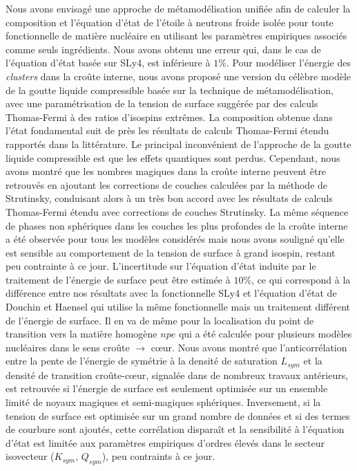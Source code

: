 Nous avons envisagé une approche de métamodélisation unifiée afin de 
calculer la composition et l'équation d'état de l'étoile à neutrons froide
isolée pour toute fonctionnelle de matière nucléaire en utilisant les 
paramètres empiriques associés comme seuls ingrédients. Nous avons obtenu une
erreur qui, dans le cas de l'équation d'état basée sur SLy4, est inférieure à 
$1\%$. 
Pour modéliser l'énergie des \textit{clusters} dans la croûte interne, nous 
avons proposé une version du célèbre modèle de la goutte liquide compressible 
basée sur la technique de métamodélisation, avec une paramétrisation de la 
tension de surface suggérée par des calculs Thomas-Fermi à des ratios 
d'isospins extrêmes. 
%
La composition obtenue dans l'état fondamental suit de près les résultats de 
calculs Thomas-Fermi étendu rapportés dans la littérature. Le principal 
inconvénient de l'approche de la goutte liquide compressible est que les effets 
quantiques sont perdus. Cependant, nous avons montré que les nombres magiques 
dans la croûte interne peuvent être retrouvés en ajoutant les corrections de 
couches calculées par la méthode de Strutinsky, conduisant alors à un très bon 
accord avec les résultats de calculs Thomas-Fermi étendu avec corrections de
couches Strutinsky. 
%
La même séquence de phases non sphériques dans les couches les plus profondes 
de la croûte interne a été observée pour tous les modèles considérés mais nous 
avons souligné qu'elle est sensible au comportement de la tension de surface à 
grand isospin, restant peu contrainte à ce jour. 
%
L'incertitude sur l'équation d'état induite par le traitement de l'énergie de 
surface peut être estimée à $10\%$, ce qui correspond à la différence entre 
nos résultats avec la fonctionnelle SLy4 et l'équation d'état de Douchin et
Haensel qui utilise la même fonctionnelle mais un traitement différent de 
l'énergie de surface. 
Il en va de même pour la localisation du point de transition vers 
la matière homogène $npe$ qui a été calculée pour plusieurs modèles nucléaires 
dans le sens croûte $\rightarrow$ c\oe ur. 
%
Nous avons montré que l'anticorrélation entre la pente de l'énergie de symétrie
à la densité de saturation $L_{sym}$ et la densité de transition 
croûte-c\oe ur, signalée dans de nombreux travaux antérieurs, est retrouvée si 
l'énergie de surface est seulement optimisée sur un ensemble limité de noyaux 
magiques et semi-magiques sphériques. 
Inversement, si la tension de surface est optimisée 
sur un grand nombre de données et si des termes de courbure sont ajoutés,
cette corrélation disparaît et la sensibilité à l'équation d'état est limitée
aux paramètres empiriques d'ordres élevés dans le secteur isovecteur 
($K_{sym}$, $Q_{sym}$), peu contraints à ce jour. 

